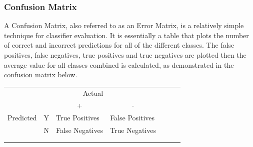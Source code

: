 \documentclass[12pt]{report}
\begin{document}
\subsubsection{Confusion Matrix}
\begin{flushleft}
A Confusion Matrix, also referred to as an Error Matrix, is a relatively simple technique for classifier evaluation. It is essentially a table that plots the number of correct and incorrect predictions for all of the different classes. The false positives, false negatives, true positives and true negatives are plotted then the average value for all classes combined is calculated, as demonstrated in the confusion matrix below.

\begin{table}[]
\begin{tabular}{lllllll}
          &                        & \multicolumn{1}{r}{Actual}           &                                      &  &  &  \\
          &                        & \multicolumn{1}{c}{+}                & \multicolumn{1}{c}{-}                &  &  &  \\ \cline{3-4}
Predicted & \multicolumn{1}{l|}{Y} & \multicolumn{1}{l|}{True Positives}  & \multicolumn{1}{l|}{False Positives} &  &  &  \\ \cline{3-4}
          & \multicolumn{1}{l|}{N} & \multicolumn{1}{l|}{False Negatives} & \multicolumn{1}{l|}{True Negatives}  &  &  &  \\ \cline{3-4}
          &                        &                                      &                                      &  &  &  \\
          &                        &                                      &                                      &  &  & 
\end{tabular}
\end{table}
\end{flushleft}
\end{document}

